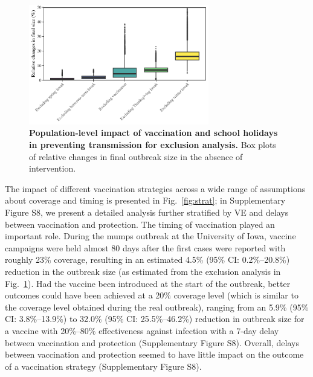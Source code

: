 \documentclass[12pt]{article}
\newcommand{\fref}[1]{Fig.~\ref{fig:#1}}
\begin{document}
\begin{figure}[!th]
\begin{center}
\includegraphics[width=0.7\textwidth]{../figure_stanfit_seirv_final/figure_stanfit_effects_exclusion.pdf}
\caption{
\textbf{Population-level impact of vaccination and school holidays in preventing transmission for exclusion analysis.}
Box plots of relative changes in final outbreak size in the absence of intervention.
}
\label{fig:popimp}
\end{center}
\end{figure}

The impact of different vaccination strategies across a wide range of assumptions about coverage and timing is presented in \fref{strat};
in Supplementary Figure S8, we present a detailed analysis further stratified by VE and delays between vaccination and protection.
The timing of vaccination played an important role.
During the mumps outbreak at the University of Iowa, vaccine campaigns were held almost 80 days after the first cases were reported with roughly 23\% coverage, resulting in an estimated 4.5\% (95\% CI: 0.2\%--20.8\%) reduction in the outbreak size (as estimated from the exclusion analysis in \fref{popimp}).
Had the vaccine been introduced at the start of the outbreak, better outcomes could have been achieved at a 20\% coverage level (which is similar to the coverage level obtained during the real outbreak), ranging from an 5.9\% (95\% CI: 3.8\%--13.9\%) to 32.0\% (95\% CI: 25.5\%--46.2\%) reduction in outbreak size for a vaccine with 20\%--80\% effectiveness against infection with a 7-day delay between vaccination and protection (Supplementary Figure S8).
Overall, delays between vaccination and protection seemed to have little impact on the outcome of a vaccination strategy (Supplementary Figure S8).
\end{document}
